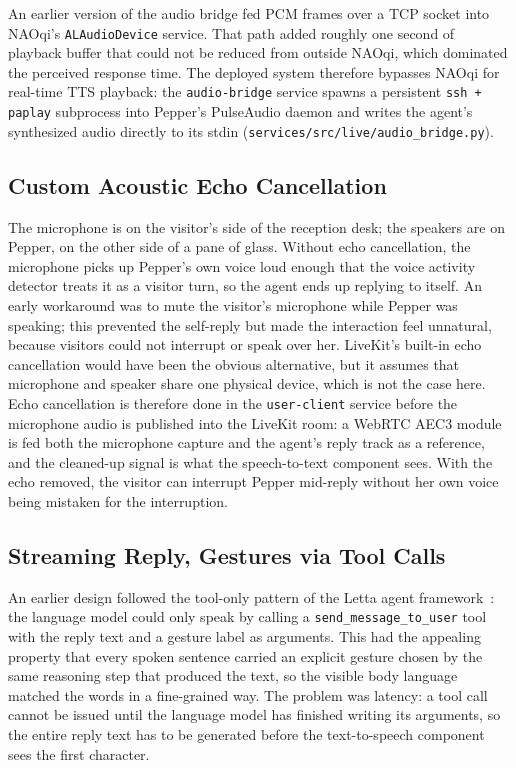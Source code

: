 An earlier version of the audio bridge fed PCM frames over a TCP socket into NAOqi's \texttt{ALAudioDevice} service.
That path added roughly one second of playback buffer that could not be reduced from outside NAOqi, which dominated the perceived response time.
The deployed system therefore bypasses NAOqi for real-time TTS playback: the \texttt{audio-bridge} service spawns a persistent \texttt{ssh + paplay} subprocess into Pepper's PulseAudio daemon and writes the agent's synthesized audio directly to its stdin (\texttt{services/src/live/audio\_bridge.py}).

\subsection{Custom Acoustic Echo Cancellation}
\label{sec:dec_aec}

The microphone is on the visitor's side of the reception desk; the speakers are on Pepper, on the other side of a pane of glass.
Without echo cancellation, the microphone picks up Pepper's own voice loud enough that the voice activity detector treats it as a visitor turn, so the agent ends up replying to itself.
An early workaround was to mute the visitor's microphone while Pepper was speaking; this prevented the self-reply but made the interaction feel unnatural, because visitors could not interrupt or speak over her.
LiveKit's built-in echo cancellation would have been the obvious alternative, but it assumes that microphone and speaker share one physical device, which is not the case here.
Echo cancellation is therefore done in the \texttt{user-client} service before the microphone audio is published into the LiveKit room: a WebRTC AEC3 module is fed both the microphone capture and the agent's reply track as a reference, and the cleaned-up signal is what the speech-to-text component sees.
With the echo removed, the visitor can interrupt Pepper mid-reply without her own voice being mistaken for the interruption.

\subsection{Streaming Reply, Gestures via Tool Calls}
\label{sec:dec_streaming}

An earlier design followed the tool-only pattern of the Letta agent framework~\cite{packer2023memgpt}: the language model could only speak by calling a \texttt{send\_message\_to\_user} tool with the reply text and a gesture label as arguments.
This had the appealing property that every spoken sentence carried an explicit gesture chosen by the same reasoning step that produced the text, so the visible body language matched the words in a fine-grained way.
The problem was latency: a tool call cannot be issued until the language model has finished writing its arguments, so the entire reply text has to be generated before the text-to-speech component sees the first character.

